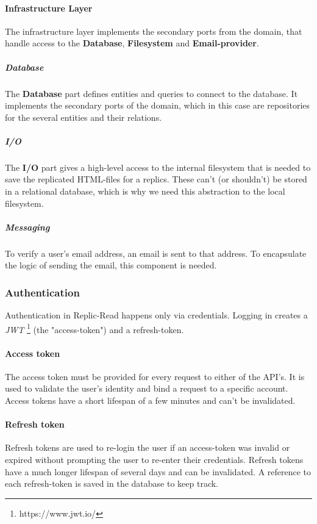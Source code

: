 \paragraph{Infrastructure Layer}
The infrastructure layer implements the secondary ports from the domain, that handle access to the \textbf{Database}, \textbf{Filesystem} and \textbf{Email-provider}.

\subparagraph{Database}
The \textbf{Database} part defines entities and queries to connect to the database.
It implements the secondary ports of the domain, which in this case are repositories for the several entities and their relations.

\subparagraph{I/O}
The \textbf{I/O} part gives a high-level access to the internal filesystem that is needed to save the replicated HTML-files for a replics.
These can't (or shouldn't) be stored in a relational database, which is why we need this abstraction to the local filesystem.

\subparagraph{Messaging}
To verify a user's email address, an email is sent to that address.
To encapsulate the logic of sending the email, this component is needed.

\subsubsection{Authentication}
Authentication in Replic-Read happens only via credentials.
Logging in creates a \textit{JWT} \footnote{https://www.jwt.io/} (the "access-token") and a refresh-token.

\paragraph{Access token}
The access token must be provided for every request to either of the API's.
It is used to validate the user's identity and bind a request to a specific account.
Access tokens have a short lifespan of a few minutes and can't be invalidated.

\paragraph{Refresh token}
Refresh tokens are used to re-login the user if an access-token was invalid or expired without prompting the user to re-enter their credentials.
Refresh tokens have a much longer lifespan of several days and can be invalidated.
A reference to each refresh-token is saved in the database to keep track.

